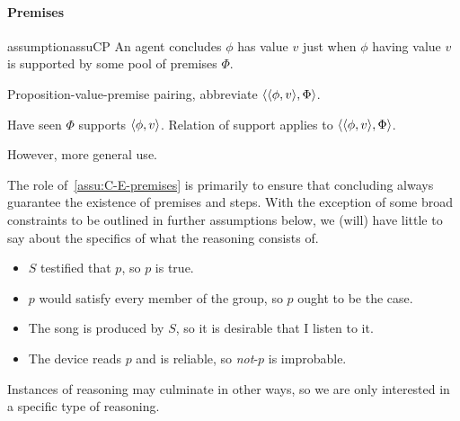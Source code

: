 \paragraph*{Premises}

\begin{note}
  \begin{restatable}{assumption}{assuCP}
    \label{assu:C-E-premises}
    An agent concludes \(\phi\) has value \(v\) just when \(\phi\) having value \(v\) is supported by some pool of premises \(\Phi\).
  \end{restatable}
\end{note}

\begin{note}[Notation]
  \begin{notation}
    Proposition-value-premise pairing, abbreviate \(\langle \langle \phi, v \rangle, \Phi \rangle\).
  \end{notation}
  Have seen \(\Phi\) supports \(\langle \phi, v \rangle\).
  Relation of support applies to \(\langle \langle \phi, v \rangle, \Phi \rangle\).

  However, more general use.
\end{note}

\begin{note}
  The role of~\autoref{assu:C-E-premises} is primarily to ensure that concluding always guarantee the existence of premises and steps.
  With the exception of some broad constraints to be outlined in further assumptions below, we (will) have little to say about the specifics of what the reasoning consists of.
\end{note}

\begin{note}
  \begin{itemize}
  \item \(S\) testified that \(p\), so \(p\) is true.
  \item \(p\) would satisfy every member of the group, so \(p\) ought to be the case.
  \item The song is produced by \(S\), so it is desirable that I listen to it.
  \item The device reads \(p\) and is reliable, so \emph{not}-\(p\) is improbable.
  \end{itemize}
\end{note}

\begin{note}
  Instances of reasoning may culminate in other ways, so we are only interested in a specific type of reasoning.
\end{note}

